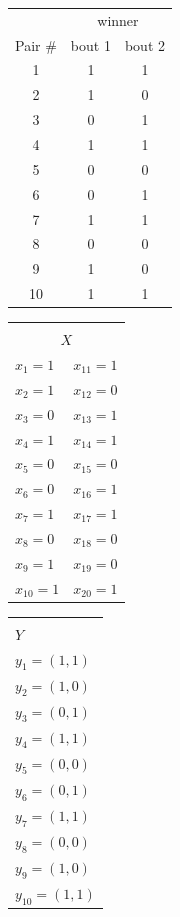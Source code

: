 \documentclass[11pt]{article}
\begin{document}
\begin{center}
\begin{tabular}{|c|c|c|}
\hline
& \multicolumn{2}{c|}{winner}\\
Pair \# & bout 1 & bout 2 \\
\hline
1 & 1 & 1  \\
\hline
2 & 1 & 0  \\
\hline
3 & 0 & 1  \\
\hline
4 & 1 & 1  \\
\hline
5 & 0 & 0  \\
\hline
6 & 0 & 1   \\
\hline
7 & 1 & 1  \\
\hline
8 & 0 & 0  \\
\hline
9 & 1 & 0  \\
\hline
10 & 1 & 1   \\
\hline
\end{tabular}
\begin{tabular}{|lc|}
\hline
& \\
\multicolumn{2}{|c|}{$X$}\\
\hline
$x_1 = 1$ & $x_{11} = 1$  \\
$x_2 = 1$ & $x_{12} = 0$  \\
$x_3 = 0$ & $x_{13} = 1$  \\
$x_4 = 1$ & $x_{14} = 1$  \\
$x_5 = 0$ & $x_{15} = 0$  \\
$x_6 = 0$ & $x_{16} = 1$  \\
$x_7 = 1$ & $x_{17} = 1$  \\
$x_8 = 0$ & $x_{18} = 0$  \\
$x_9 = 1$ & $x_{19} = 0$  \\
$x_{10} = 1$ & $x_{20} = 1$  \\
\hline
\end{tabular}
\begin{tabular}{|l|}
\hline
\\
$Y$\\
\hline
$y_1 = (1, 1)$   \\
$y_2 = (1, 0)$  \\
$y_3 = (0, 1)$  \\
$y_4 = (1, 1)$  \\
$y_5 = (0, 0)$  \\
$y_6 = (0, 1)$  \\
$y_7 = (1, 1)$  \\
$y_8 = (0, 0)$  \\
$y_9 = (1, 0)$  \\
$y_{10} = (1, 1)$  \\

\end{tabular}
\end{center}
\end{document}
